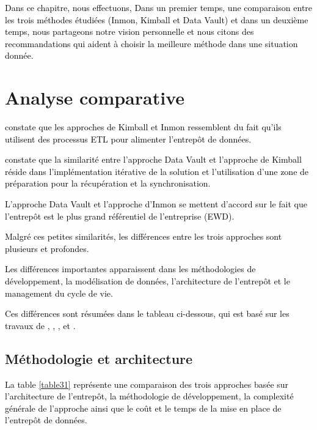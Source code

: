 \documentclass[a4paper,12pt]{report}
\begin{document}
\textcolor{black}{Dans ce chapitre, nous effectuons, Dans un premier temps, une comparaison entre les trois méthodes étudiées (Inmon, Kimball et Data Vault) et dans un deuxième temps, nous partageons notre vision personnelle et nous citons des recommandations qui aident à choisir la meilleure méthode dans une situation donnée.}

\section{Analyse comparative}
\textcolor{black}{\citep{breslin2004data} constate que les approches de Kimball et Inmon ressemblent du fait qu’ils utilisent des processus ETL pour alimenter l’entrepôt de données.}

\textcolor{black}{\citep{12}constate que la similarité entre l’approche Data Vault et l’approche de Kimball réside dans l’implémentation itérative de la solution et l’utilisation d’une zone de préparation pour la récupération et la synchronisation.}

\textcolor{black}{L’approche Data Vault et l’approche d’Inmon se mettent d’accord sur le fait que l’entrepôt est le plus grand référentiel de l’entreprise (EWD).}

\textcolor{black}{Malgré ces petites similarités, les différences entre les trois approches sont plusieurs et profondes.}

\textcolor{black}{Les différences importantes apparaissent dans les méthodologies de développement, la modélisation de données, l’architecture de l’entrepôt et le management du cycle de vie.}

\textcolor{black}{Ces différences sont résumées dans le tableau ci-dessous, qui est basé sur les travaux de \citep{breslin2004data}, \citep{weir2008}, \citep{schneider2014com}, \citep{schalk14} et \citep{13}.}
 \subsection{Méthodologie et architecture}
 \textcolor{black}{La table \ref{table31} représente une comparaison des trois approches  basée sur l'architecture de l'entrepôt, la méthodologie de développement, la complexité générale de l'approche ainsi que le coût et le temps de la mise en place de l'entrepôt de données.}
\end{document}
